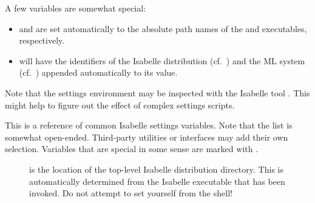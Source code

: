 \begin{isabellebody}
\begin{isamarkuptext}
  \medskip A few variables are somewhat special:

  \begin{itemize}

  \item {}\hypertarget{setting.ISABELLE-PROCESS}{\hyperlink{setting.ISABELLE-PROCESS}{\mbox{}}} and \hypertarget{setting.ISABELLE-TOOL}{\hyperlink{setting.ISABELLE-TOOL}{\mbox{}}} are set
  automatically to the absolute path names of the \hyperlink{executable.isabelle-process}{\mbox{}} and \hyperlink{executable.isabelle}{\mbox{}} executables,
  respectively.
  
  \item {}\hyperlink{setting.ISABELLE-OUTPUT}{\mbox{}} will have the identifiers of
  the Isabelle distribution (cf.\ \hyperlink{setting.ISABELLE-IDENTIFIER}{\mbox{}}) and
  the ML system (cf.\ \hyperlink{setting.ML-IDENTIFIER}{\mbox{}}) appended automatically
  to its value.

  \end{itemize}

  \medskip Note that the settings environment may be inspected with
  the Isabelle tool \hyperlink{tool.getenv}{\mbox{}}.  This might help to figure out the
  effect of complex settings scripts.%
\end{isamarkuptext}%
\isamarkuptrue%
%
\isamarkuptrue%
%
\begin{isamarkuptext}%
This is a reference of common Isabelle settings variables. Note that
  the list is somewhat open-ended. Third-party utilities or interfaces
  may add their own selection. Variables that are special in some
  sense are marked with \isa{{\isachardoublequote}\isactrlsup {\isacharasterisk}{\isachardoublequote}}.

  \begin{description}

  \item[\hypertarget{setting.ISABELLE-HOME}{\hyperlink{setting.ISABELLE-HOME}{\mbox{}}}\isa{{\isachardoublequote}\isactrlsup {\isacharasterisk}{\isachardoublequote}}] is the
  location of the top-level Isabelle distribution directory. This is
  automatically determined from the Isabelle executable that has been
  invoked.  Do not attempt to set \hyperlink{setting.ISABELLE-HOME}{\mbox{}} yourself
  from the shell!
  

\end{description}
\end{isamarkuptext}
\end{isabellebody}

